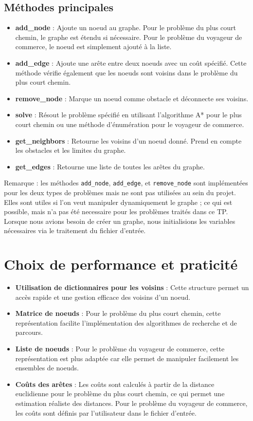 \subsection{Méthodes principales}
\begin{itemize}
    \item \textbf{add\_node} : Ajoute un noeud au graphe. Pour le problème du plus court chemin, le graphe est étendu si nécessaire. Pour le problème du voyageur de commerce, le noeud est simplement ajouté à la liste.
    \item \textbf{add\_edge} : Ajoute une arête entre deux noeuds avec un coût spécifié. Cette méthode vérifie également que les noeuds sont voisins dans le problème du plus court chemin.
    \item \textbf{remove\_node} : Marque un noeud comme obstacle et déconnecte ses voisins.
    \item \textbf{solve} : Résout le problème spécifié en utilisant l'algorithme A* pour le plus court chemin ou une méthode d'énumération pour le voyageur de commerce.
    \item \textbf{get\_neighbors} : Retourne les voisins d'un noeud donné. Prend en compte les obstacles et les limites du graphe.
    \item \textbf{get\_edges} : Retourne une liste de toutes les arêtes du graphe.
\end{itemize}

Remarque : les méthodes \texttt{add\_node}, \texttt{add\_edge}, et \texttt{remove\_node} sont implémentées pour les deux types de problèmes mais ne sont pas utilisées au sein du projet. Elles sont utiles si l'on veut manipuler dynamiquement le graphe ; ce qui est possible, mais n'a pas été necessaire pour les problèmes traités dans ce TP. Lorsque nous avions besoin de créer un graphe, nous initialisions les variables nécessaires via le traitement du fichier d'entrée.

\section{Choix de performance et praticité}
\begin{itemize}
    \item \textbf{Utilisation de dictionnaires pour les voisins} : Cette structure permet un accès rapide et une gestion efficace des voisins d'un noeud.
    \item \textbf{Matrice de noeuds} : Pour le problème du plus court chemin, cette représentation facilite l'implémentation des algorithmes de recherche et de parcours.
    \item \textbf{Liste de noeuds} : Pour le problème du voyageur de commerce, cette représentation est plus adaptée car elle permet de manipuler facilement les ensembles de noeuds.
    \item \textbf{Coûts des arêtes} : Les coûts sont calculés à partir de la distance euclidienne pour le problème du plus court chemin, ce qui permet une estimation réaliste des distances. Pour le problème du voyageur de commerce, les coûts sont définis par l'utilisateur dans le fichier d'entrée.
\end{itemize}



